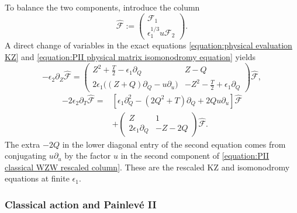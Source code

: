 \documentclass[a4paper,11pt]{article}
\newcommand{\cF}{\mathcal{F}}
\numberwithin{equation}{section}
\begin{document}
To balance the two components, introduce the column
\begin{equation}
	\label{equation:PII classical WZW rescaled column}
	\widehat{\cF}
	:=\begin{pmatrix}\cF_{1}\\ \epsilon_{1}^{1/3}u\cF_{2}\end{pmatrix}.
\end{equation}
A direct change of variables in the exact equations
\eqref{equation:physical evaluation KZ} and
\eqref{equation:PII physical matrix isomonodromy equation} yields
\begin{equation}
	\label{equation:PII classical WZW exact Z connection}
	-\epsilon_{2}\partial_{Z}\widehat{\cF}
	=\begin{pmatrix}
		Z^{2}+\frac{T}{2}-\epsilon_{1}\partial_{Q} & Z-Q\\[2mm]
		2\epsilon_{1}\bigl((Z+Q)\partial_{Q}-u\partial_{u}\bigr)&
		-Z^{2}-\frac{T}{2}+\epsilon_{1}\partial_{Q}
	\end{pmatrix}\widehat{\cF},
\end{equation}
\begin{equation}
	\begin{aligned}
		-2\epsilon_{2}\partial_{T}\widehat{\cF}
		={}&\left[
		\epsilon_{1}\partial_{Q}^{2}-(2Q^{2}+T)\partial_{Q}
		+2Qu\partial_{u}\right]\widehat{\cF}\\
		&+\begin{pmatrix}
			Z&1\\[1mm]2\epsilon_{1}\partial_{Q}&-Z-2Q
		\end{pmatrix}\widehat{\cF}.
	\end{aligned}
\end{equation}
The extra $-2Q$ in the lower diagonal entry of the second equation
comes from conjugating $u\partial_{u}$ by the factor $u$ in the second
component of \eqref{equation:PII classical WZW rescaled column}.
These are the rescaled KZ and isomonodromy equations at finite
$\epsilon_{1}$.

\subsubsection{Classical action and Painlev\'e II}
\label{subsection:PII WZW asymptotics}
\end{document}
